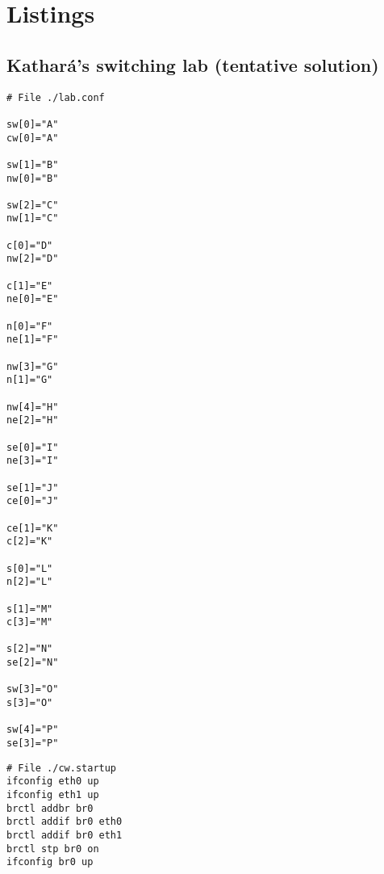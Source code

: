 \chapter{Listings}
\label{ch:listings}

\section{Kathará's switching lab (tentative solution)}

\begin{lstlisting}[frame=single,caption=Lab 2's topology configuration,captionpos=b,label=listlab2conf]
# File ./lab.conf

sw[0]="A"
cw[0]="A"

sw[1]="B"
nw[0]="B"

sw[2]="C"
nw[1]="C"

c[0]="D"
nw[2]="D"

c[1]="E"
ne[0]="E"

n[0]="F"
ne[1]="F"

nw[3]="G"
n[1]="G"

nw[4]="H"
ne[2]="H"

se[0]="I"
ne[3]="I"

se[1]="J"
ce[0]="J"

ce[1]="K"
c[2]="K"

s[0]="L"
n[2]="L"

s[1]="M"
c[3]="M"

s[2]="N"
se[2]="N"

sw[3]="O"
s[3]="O"

sw[4]="P"
se[3]="P"
\end{lstlisting}

\begin{lstlisting}[frame=single,caption=Example node startup configuration,captionpos=b,label=listlab2startup]
# File ./cw.startup
ifconfig eth0 up
ifconfig eth1 up
brctl addbr br0
brctl addif br0 eth0
brctl addif br0 eth1
brctl stp br0 on
ifconfig br0 up
\end{lstlisting}

